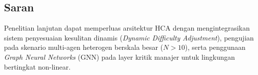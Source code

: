 \documentclass[conference]{IEEEtran}
\begin{document}
\subsection{Saran}
Penelitian lanjutan dapat memperluas arsitektur HCA dengan mengintegrasikan sistem penyesuaian kesulitan dinamis (\textit{Dynamic Difficulty Adjustment}), pengujian pada skenario multi-agen heterogen berskala besar (\(N > 10\)), serta penggunaan \textit{Graph Neural Networks} (GNN) pada layer kritik manajer untuk lingkungan bertingkat non-linear.



\end{document}

